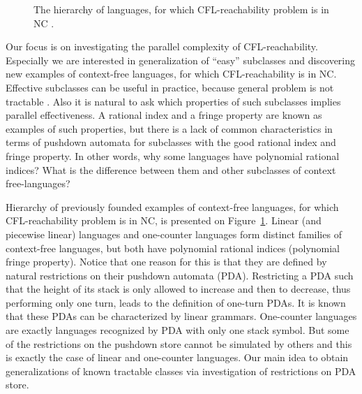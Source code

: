 \documentclass[smallextended]{svjour3}       %
\begin{document}
\begin{figure}
\centering
{}
\caption{The hierarchy of languages, for which CFL-reachability problem is in NC .}
\label{hierarchy}      
\end{figure}
Our focus is on investigating the parallel complexity of CFL-reachability. Especially we are interested in generalization of ``easy'' subclasses and discovering new examples of context-free languages, for which CFL-reachability is in NC. Effective subclasses can be useful in practice, because general problem is not tractable \cite{ExperimentalCFPQ}. Also it is natural to ask which properties of such subclasses implies parallel effectiveness. A rational index and a fringe property are known as examples of such properties, but there is a lack of common characteristics in terms of pushdown automata for subclasses with the good rational index and fringe property. In other words, why some languages have polynomial rational indices? What is the difference between them and other subclasses of context free-languages?


Hierarchy of previously founded examples of context-free languages, for which CFL-reachability problem is in NC, is presented on Figure~\ref{hierarchy}. Linear (and piecewise linear) languages and one-counter languages form distinct families of context-free languages, but both have polynomial rational indices (polynomial fringe property).  Notice that one reason for this is that they are defined by natural restrictions on their pushdown automata (PDA). Restricting a PDA such that the height of its stack is only allowed to increase and then to decrease, thus performing only one turn, leads to the definition of one-turn PDAs. It is known that these PDAs can be characterized by linear grammars. One-counter languages are exactly languages recognized by PDA with only one stack symbol. But some of the restrictions on the pushdown store cannot be simulated by others and this is exactly the case of linear and one-counter languages. Our main idea to obtain generalizations of known tractable classes via investigation of restrictions on PDA store.
\end{document}
